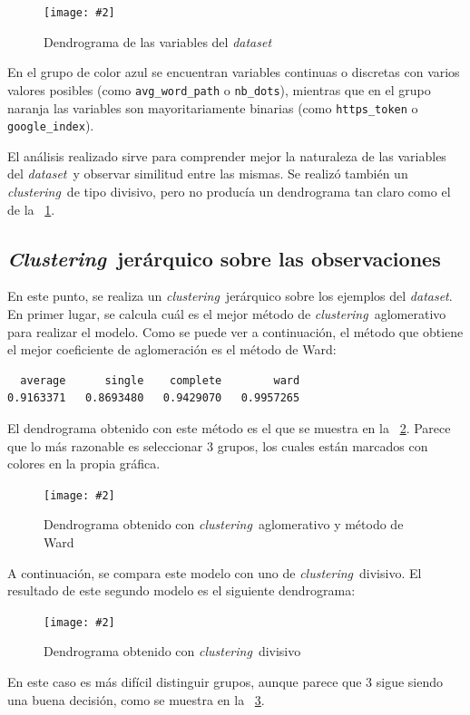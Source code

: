 \documentclass[12pt, a4paper]{article}
\renewcommand{\textit}{\textsl}
\newcommand*{\figref}[1]{\figurename~\ref{fig:#1}}
\newcommand{\figcaption}[4][H]{
  \begin{figure}[#1]
    \centering
    \texttt{[image: \#2]}
    \caption{#3}
    \label{fig:#2}
  \end{figure}
}
\newcommand*{\clustering}{\textit{clustering}}
\newcommand*{\Clustering}{\textit{Clustering}}
\newcommand*{\dataset}{\textit{dataset}}
\begin{document}
      \figcaption{dend_var.png}{Dendrograma de las variables del \dataset}{1}

      En el grupo de color azul se encuentran variables continuas o discretas con varios valores posibles (como \texttt{avg\_word\_path} o \texttt{nb\_dots}), mientras que en el grupo naranja las variables son mayoritariamente binarias (como \texttt{https\_token} o \texttt{google\_index}).

      El análisis realizado sirve para comprender mejor la naturaleza de las variables del \dataset\ y observar similitud entre las mismas. Se realizó también un \clustering\ de tipo divisivo, pero no producía un dendrograma tan claro como el de la \figref{dend_var.png}.

    \subsection{\Clustering\ jerárquico sobre las observaciones}

      En este punto, se realiza un \clustering\ jerárquico sobre los ejemplos del \dataset. En primer lugar, se calcula cuál es el mejor método de \clustering\ aglomerativo para realizar el modelo. Como se puede ver a continuación, el método que obtiene el mejor coeficiente de aglomeración es el método de Ward:

      \begin{verbatim}
  average      single    complete        ward
0.9163371   0.8693480   0.9429070   0.9957265
      \end{verbatim}

      El dendrograma obtenido con este método es el que se muestra en la \figref{ward.png}. Parece que lo más razonable es seleccionar $3$ grupos, los cuales están marcados con colores en la propia gráfica.

      \figcaption{ward.png}{Dendrograma obtenido con \clustering\ aglomerativo y método de Ward}{1}

      A continuación, se compara este modelo con uno de \clustering\ divisivo. El resultado de este segundo modelo es el siguiente dendrograma:

      \figcaption{diana.png}{Dendrograma obtenido con \clustering\ divisivo}{1}

      \newpage

      En este caso es más difícil distinguir grupos, aunque parece que $3$ sigue siendo una buena decisión, como se muestra en la \figref{diana.png}.
\end{document}

